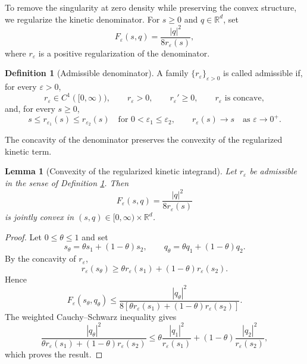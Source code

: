 \documentclass[11pt]{article}
\newcommand{\R}{\mathbb{R}}
\newcommand{\eps}{\varepsilon}
\theoremstyle{plain}
\newtheorem{lemma}[theorem]{Lemma}
\theoremstyle{definition}
\newtheorem{definition}[theorem]{Definition}
\numberwithin{equation}{section}
\begin{document}
To remove the singularity at zero density while preserving the convex
structure, we regularize the kinetic denominator. For $s\ge0$ and
$q\in\R^d$, set
\begin{equation}
\label{eq:regularized-kinetic-integrand}
F_\eps(s,q)
=
\frac{|q|^2}{8r_\eps(s)},
\end{equation}
where $r_\eps$ is a positive regularization of the denominator.

\begin{definition}[Admissible denominator]
\label{def:admissible-regularization}
A family $\{r_\eps\}_{\eps>0}$ is called admissible if, for every
$\eps>0$,
\begin{equation}
\label{eq:regularization-admissibility-local}
r_\eps\in C^1([0,\infty)),
\qquad
r_\eps>0,
\qquad
r_\eps'\ge0,
\qquad
r_\eps \text{ is concave},
\end{equation}
and, for every $s\ge0$,
\begin{equation}
\label{eq:regularization-admissibility-limit}
s
\le
r_{\eps_1}(s)
\le
r_{\eps_2}(s)
\quad
\text{for }0<\eps_1\le\eps_2,
\qquad
r_\eps(s)\to s
\quad\text{as }\eps\to0^+.
\end{equation}
\end{definition}

The concavity of the denominator preserves the
convexity of the regularized kinetic term.

\begin{lemma}[Convexity of the regularized kinetic integrand]
\label{lem:regularized-kinetic-convexity}
Let $r_\eps$ be admissible in the sense of Definition \ref{def:admissible-regularization}. Then
\[
F_\eps(s,q)
=
\frac{|q|^2}{8r_\eps(s)}
\]
is jointly convex in $(s,q)\in[0,\infty)\times\R^d$.
\end{lemma}

\begin{proof}
Let $0\le\theta\le1$ and set
\[
s_\theta=\theta s_1+(1-\theta)s_2,
\qquad
q_\theta=\theta q_1+(1-\theta)q_2.
\]
By the concavity of $r_\eps$,
\[
r_\eps(s_\theta)
\ge
\theta r_\eps(s_1)+(1-\theta)r_\eps(s_2).
\]
Hence
\[
F_\eps(s_\theta,q_\theta)
\le
\frac{|q_\theta|^2}
{8[\theta r_\eps(s_1)+(1-\theta)r_\eps(s_2)]}.
\]
The weighted Cauchy--Schwarz inequality gives
\[
\frac{|q_\theta|^2}
{\theta r_\eps(s_1)+(1-\theta)r_\eps(s_2)}
\le
\theta\frac{|q_1|^2}{r_\eps(s_1)}
+
(1-\theta)\frac{|q_2|^2}{r_\eps(s_2)},
\]
which proves the result.
\end{proof} 
\end{document}
